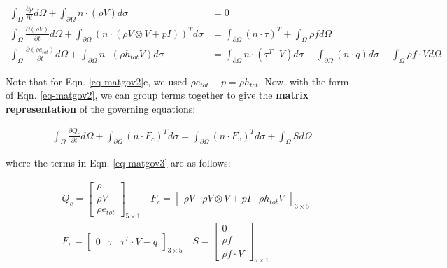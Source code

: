 \documentclass[12pt, letterpaper]{report}
\begin{document}
\begin{subequations}\label{eq-matgov2}
   \begin{align}
      \int_{\Omega}\frac{\partial \rho}{\partial t}d\Omega + \int_{\partial \Omega} n \cdot (\rho V)
      d\sigma &= 0 \\ \int_\Omega \frac{\partial(\rho V)}{\partial t}d\Omega + \int_{\partial\Omega}
      \left(n \cdot (\rho V \mathop{\otimes} V + pI)\right)^T d\sigma & = \int_{\partial\Omega} (n
      \cdot \tau)^T + \int_\Omega \rho f d\Omega \\ \int_\Omega\frac{\partial(\rho e_{tot})}{\partial
      t} d\Omega + \int_{\partial\Omega} n \cdot (\rho h_{tot} V) d\sigma & = \int_{\partial\Omega} n
      \cdot (\tau^T \cdot V) d\sigma - \int_{\partial\Omega}(n \cdot q) d\sigma  + \int_\Omega \rho f
      \cdot V d\Omega 
   \end{align}
\end{subequations}

Note that for Eqn. \ref{eq-matgov2}c, we used $\rho e_{tot} + p = \rho h_{tot}$. Now, with the form
of Eqn. \ref{eq-matgov2}, we can group terms together to give the {\bf matrix representation} of the
governing equations:

\begin{align}\label{eq-matgov3}
   \int_{\Omega}\frac{\partial Q_c}{\partial t}d\Omega +  \int_{\partial \Omega} (n \cdot F_c)^T
   d\sigma = \int_{\partial \Omega} (n \cdot F_v)^T d\sigma + \int_{\Omega} S d\Omega
\end{align}

where the terms in Eqn. \ref{eq-matgov3} are as follows:

\begin{align*}
   &Q_c = \begin{bmatrix} 
      \rho \\
      \rho V \\
      \rho e_{tot}
   \end{bmatrix}_{5\times1} \quad 
   F_c = \begin{bmatrix} \rho V & \rho V\mathop{\otimes}V + pI & \rho h_{tot} V
      \end{bmatrix}_{3\times5} \\
      &F_v = \begin{bmatrix}0 & \tau & \tau^T \cdot V -
   q\end{bmatrix}_{3\times5} \quad S = \begin{bmatrix}
      0 \\
      \rho f \\
      \rho f \cdot V
      \end{bmatrix}_{5\times1}
\end{align*}
\end{document}
